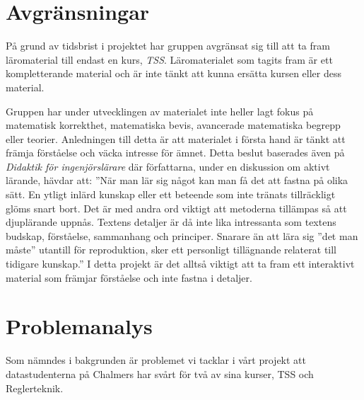 \documentclass[]{article}
\begin{document}
\section{Avgränsningar}

På grund av tidsbrist i projektet har gruppen avgränsat sig till att ta fram
läromaterial till endast en kurs, \textit{TSS}. Läromaterialet som tagits fram är ett
kompletterande material och är inte tänkt att kunna ersätta kursen eller
dess material.

Gruppen har under utvecklingen av materialet inte heller lagt fokus på matematisk korrekthet,
matematiska bevis, avancerade matematiska begrepp eller teorier.  Anledningen till detta är att
materialet  i första hand är tänkt att främja förståelse och väcka intresse för ämnet. Detta beslut
baserades även på \textit{Didaktik för ingenjörslärare} där författarna, under en diskussion om aktivt lärande,
hävdar att: ”När man lär sig något kan man få det att fastna på olika sätt. En ytligt inlärd kunskap
eller ett beteende som inte tränats tillräckligt glöms snart bort. Det är med andra ord viktigt att
metoderna tillämpas så att djuplärande uppnås. Textens detaljer är då inte lika intressanta som textens
budskap, förståelse, sammanhang och principer. Snarare än att lära sig ”det man måste” utantill för
reproduktion, sker ett personligt tillägnande relaterat till tidigare kunskap.” I detta projekt är det
alltså viktigt att ta fram ett interaktivt material som främjar förståelse och inte fastna i detaljer.

\section{Problemanalys}


Som nämndes i bakgrunden är problemet vi tacklar i vårt projekt att
datastudenterna på Chalmers har svårt för två av sina kurser,
TSS och Reglerteknik.
\end{document}
